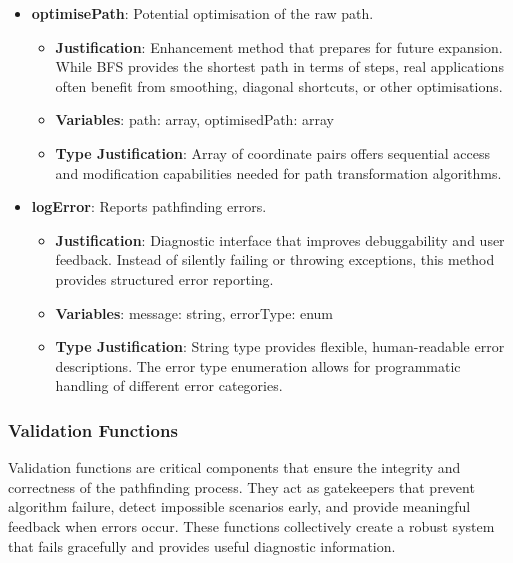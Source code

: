 \begin{itemize}
  \item \textbf{optimisePath}: Potential optimisation of the raw path.
    \begin{itemize}
      \item \textbf{Justification}: Enhancement method that prepares for future expansion. While BFS provides the shortest path in terms of steps, real applications often benefit from smoothing, diagonal shortcuts, or other optimisations.
      \item \textbf{Variables}: path: array, optimisedPath: array
      \item \textbf{Type Justification}: Array of coordinate pairs offers sequential access and modification capabilities needed for path transformation algorithms.
    \end{itemize}
    
  \item \textbf{logError}: Reports pathfinding errors.
    \begin{itemize}
      \item \textbf{Justification}: Diagnostic interface that improves debuggability and user feedback. Instead of silently failing or throwing exceptions, this method provides structured error reporting.
      \item \textbf{Variables}: message: string, errorType: enum
      \item \textbf{Type Justification}: String type provides flexible, human-readable error descriptions. The error type enumeration allows for programmatic handling of different error categories.
    \end{itemize}
\end{itemize}

\subsubsection*{Validation Functions}
Validation functions are critical components that ensure the integrity and correctness of the pathfinding process. They act as gatekeepers that prevent algorithm failure, detect impossible scenarios early, and provide meaningful feedback when errors occur. These functions collectively create a robust system that fails gracefully and provides useful diagnostic information.

